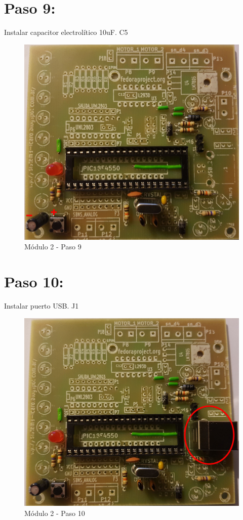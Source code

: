 \newpage

\section{Paso 9:}

Instalar capacitor electrolítico 10uF. C5

\begin{figure}[h]
	\centering
	\includegraphics[width=0.8\linewidth]{Modulo_2/M2_9}
	\caption{Módulo 2 - Paso 9}
	\label{fig:M2_9}
\end{figure}

\newpage

\section{Paso 10:}

Instalar puerto USB. J1

\begin{figure}[h]
	\centering
	\includegraphics[width=0.8\linewidth]{Modulo_2/M2_10}
	\caption{Módulo 2 - Paso 10}
	\label{fig:M2_10}
\end{figure}

